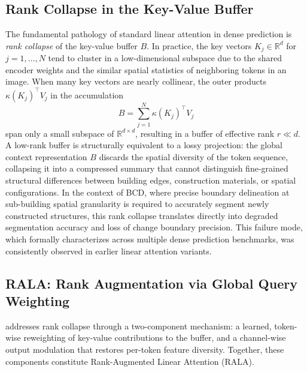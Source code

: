 \subsection{Rank Collapse in the Key-Value Buffer}

The fundamental pathology of standard linear attention in dense prediction is
\emph{rank collapse} of the key-value buffer $B$. In practice, the key vectors
$K_j \in \mathbb{R}^d$ for $j = 1, \ldots, N$ tend to cluster in a
low-dimensional subspace due to the shared encoder weights and the similar
spatial statistics of neighboring tokens in an image. When many key vectors
are nearly collinear, the outer products $\kappa(K_j)^\top V_j$ in the
accumulation
\begin{equation}
B = \sum_{j=1}^{N} \kappa(K_j)^\top V_j
\label{eq:standard_kv_buffer}
\end{equation}
span only a small subspace of $\mathbb{R}^{d \times d}$, resulting in a
buffer of effective rank $r \ll d$. A low-rank buffer is structurally
equivalent to a lossy projection: the global context representation $B$
discards the spatial diversity of the token sequence, collapsing it into a
compressed summary that cannot distinguish fine-grained structural differences
between building edges, construction materials, or spatial configurations.
In the context of BCD, where precise boundary delineation at sub-building
spatial granularity is required to accurately segment newly constructed
structures, this rank collapse translates directly into degraded segmentation
accuracy and loss of change boundary precision. This failure mode, which
\cite{Fan2025RALA} formally characterizes across multiple dense prediction
benchmarks, was consistently observed in earlier linear attention variants.

\subsection{RALA: Rank Augmentation via Global Query Weighting}

\cite{Fan2025RALA} addresses rank collapse through a two-component mechanism:
a learned, token-wise reweighting of key-value contributions to the buffer,
and a channel-wise output modulation that restores per-token feature diversity.
Together, these components constitute Rank-Augmented Linear Attention (RALA).


